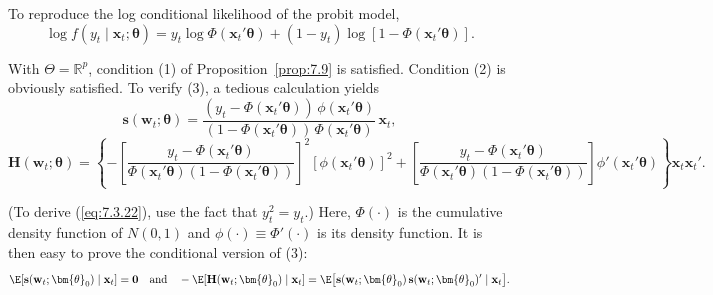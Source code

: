 \begin{example}
\label{ex:7.11}
To reproduce the log conditional likelihood of the probit model,
\begin{equation}
\label{eq:7.3.20}
\log f(y_t \mid \mathbf{x}_t; \bm{\theta}) = y_t \log \Phi(\mathbf{x}_t'\bm{\theta}) + (1 - y_t)\log[1 - \Phi(\mathbf{x}_t'\bm{\theta})].
\end{equation}

With $\Theta = \mathbb{R}^p$, condition (1) of Proposition~\ref{prop:7.9} is satisfied. Condition (2) is obviously satisfied. To verify (3), a tedious calculation yields
\begin{equation}
\label{eq:7.3.21}
\mathbf{s}(\mathbf{w}_t; \bm{\theta}) = \frac{(y_t - \Phi(\mathbf{x}_t'\bm{\theta}))\,\phi(\mathbf{x}_t'\bm{\theta})}{(1 - \Phi(\mathbf{x}_t'\bm{\theta}))\,\Phi(\mathbf{x}_t'\bm{\theta})} \, \mathbf{x}_t,
\end{equation}
\begin{equation}
\label{eq:7.3.22}
\mathbf{H}(\mathbf{w}_t; \bm{\theta}) = \left\{ -\left[\frac{y_t - \Phi(\mathbf{x}_t'\bm{\theta})}{\Phi(\mathbf{x}_t'\bm{\theta})(1-\Phi(\mathbf{x}_t'\bm{\theta}))}\right]^2 [\phi(\mathbf{x}_t'\bm{\theta})]^2 + \left[\frac{y_t - \Phi(\mathbf{x}_t'\bm{\theta})}{\Phi(\mathbf{x}_t'\bm{\theta})(1-\Phi(\mathbf{x}_t'\bm{\theta}))}\right]\phi'(\mathbf{x}_t'\bm{\theta}) \right\} \mathbf{x}_t \mathbf{x}_t'.
\end{equation}

(To derive (\ref{eq:7.3.22}), use the fact that $y_t^2 = y_t$.) Here, $\Phi(\cdot)$ is the cumulative density function of $N(0,1)$ and $\phi(\cdot) \equiv \Phi'(\cdot)$ is its density function. It is then easy to prove the conditional version of (3):
\begin{equation}
\label{eq:7.3.23}
\E[\mathbf{s}(\mathbf{w}_t; \bm{\theta}_0) \mid \mathbf{x}_t] = \mathbf{0} \quad \text{and} \quad -\E[\mathbf{H}(\mathbf{w}_t; \bm{\theta}_0) \mid \mathbf{x}_t] = \E\bigl[\mathbf{s}(\mathbf{w}_t; \bm{\theta}_0)\,\mathbf{s}(\mathbf{w}_t; \bm{\theta}_0)' \mid \mathbf{x}_t\bigr].
\end{equation}


\end{example}
